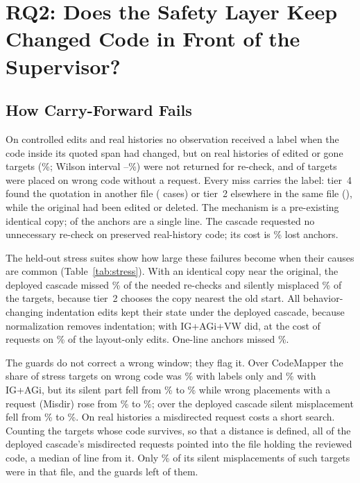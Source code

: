 \section{RQ2: Does the Safety Layer Keep Changed Code in Front of the Supervisor?}\label{sec:layer}

\subsection{How Carry-Forward Fails}
On controlled edits and real histories no observation received a  label when the code inside its quoted span had changed, but on real histories \smRealCasMissK{} of \smRealCasMissN{} edited or gone targets (\smRealCasMissPct\%; Wilson interval \smRealCasMissLo--\smRealCasMissHi\%) were not returned for re-check, and \smRealCasSilentK{} of \smRealCasSilentN{} targets were placed on wrong code without a request. Every miss carries the  label: tier~4 found the quotation in another file (\wpaMissCross{} cases) or tier~2 elsewhere in the same file (\wpaMissSame), while the original had been edited or deleted. The mechanism is a pre-existing identical copy; \wpaMissSingleLine{} of the \wpaMissTotal{} anchors are a single line. The cascade requested no unnecessary re-check on preserved real-history code; its cost is \smRealCasLostPct\% lost anchors.



The held-out stress suites show how large these failures become when their causes are common (Table~\ref{tab:stress}). With an identical copy near the original, the deployed cascade missed \wiFrDupDepMiss\% of the needed re-checks and silently misplaced \wiFrDupDepSilent\% of the targets, because tier~2 chooses the copy nearest the old start. All \wiFrIndDepMissK{} behavior-changing indentation edits kept their state under the deployed cascade, because normalization removes indentation; with IG+AGi+VW \wiFrIndCasGiMissK{} did, at the cost of requests on \wiFrIndCasGiFalse\% of the layout-only edits. One-line anchors missed \wiFrShortDepMiss\%.

The guards do not correct a wrong window; they flag it. Over CodeMapper the share of stress targets on wrong code was \wiFrCmQWrong\% with labels only and \wiFrCmGiWrong\% with IG+AGi, but its silent part fell from \wiFrCmQSilent\% to \wiFrCmGiSilent\% while wrong placements with a request (Misdir) rose from \wiFrCmQMisdir\% to \wiFrCmGiMisdir\%; over the deployed cascade silent misplacement fell from \wiFrDepSilent\% to \wiFrCasGiSilent\%. On real histories a misdirected request costs a short search. Counting the targets whose code survives, so that a distance is defined, all \wzRealDepMisN{} of the deployed cascade's misdirected requests pointed into the file holding the reviewed code, a median of \wzRealDepMisDist{} line from it. Only \wzRealDepSilSame\% of its \wzRealDepSilN{} silent misplacements of such targets were in that file, and the guards left \wzRealGiSilN{} of them.

